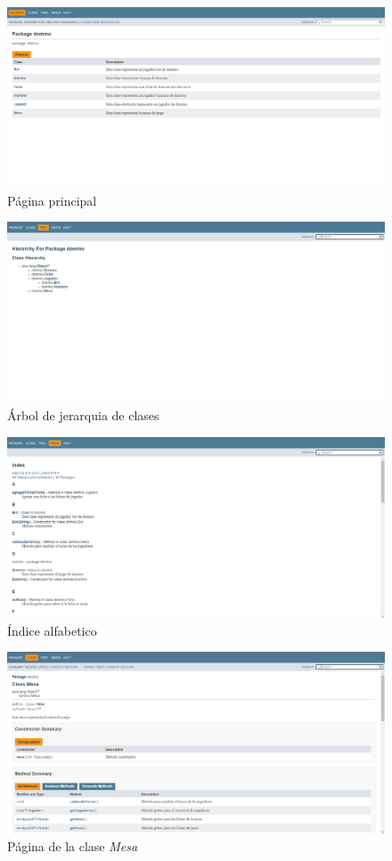 \documentclass[12pt]{article}
\begin{document}
  \begin{figure}[h!]
    \centering
    \includegraphics[width=\textwidth]{doc1.png}
    \caption{Página principal}
  \end{figure}

  \begin{figure}[h!]
    \centering
    \includegraphics[width=\textwidth]{doc2.png}
    \caption{Árbol de jerarquia de clases}
  \end{figure}

  \begin{figure}[h!]
    \centering
    \includegraphics[width=\textwidth]{doc3.png}
    \caption{Índice alfabetico}
  \end{figure}

  \begin{figure}[h!]
    \centering
    \includegraphics[width=\textwidth]{doc4.png}
    \caption{Página de la clase \textit{Mesa}} 
  \end{figure}
\end{document}
